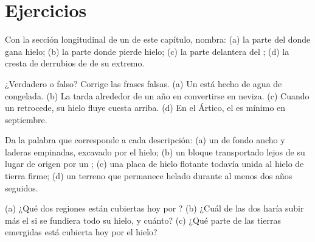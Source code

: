 \section{Ejercicios}

\begin{exercise}[$\star$]\label{exo:g8:ice-on-earth:1}
Con la sección longitudinal de un  de este capítulo, nombra: (a) la
parte del  donde gana hielo; (b) la parte donde pierde hielo; (c) la
parte delantera del ; (d) la cresta de derrubios de  de su
extremo.
\end{exercise}

\begin{exercise}[$\star$]\label{exo:g8:ice-on-earth:2}
¿Verdadero o falso? Corrige las frases falsas. (a) Un  está hecho de
agua de  congelada. (b) La  tarda alrededor de un año en
convertirse en neviza. (c) Cuando un  retrocede, su hielo fluye
cuesta arriba. (d) En el Ártico, el  es mínimo en septiembre.
\end{exercise}

\begin{exercise}[$\star$]\label{exo:g8:ice-on-earth:3}
Da la palabra que corresponde a cada descripción: (a) un  de fondo
ancho y laderas empinadas, excavado por el hielo; (b) un bloque
transportado lejos de su lugar de origen por un ; (c) una placa de
hielo flotante todavía unida al hielo de tierra firme; (d) un terreno que
permanece helado durante al menos dos años seguidos.
\end{exercise}

\begin{exercise}[$\star$]\label{exo:g8:ice-on-earth:4}
(a) ¿Qué dos regiones están cubiertas hoy por ? (b) ¿Cuál
de las dos haría subir más el  si se fundiera todo su hielo, y cuánto?
(c) ¿Qué parte de las tierras emergidas está cubierta hoy por el hielo?
\end{exercise}

